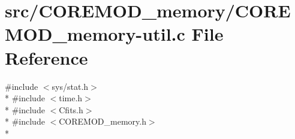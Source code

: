 \hypertarget{src_2COREMOD__memory_2COREMOD__memory-util_8c}{\section{src/\+C\+O\+R\+E\+M\+O\+D\+\_\+memory/\+C\+O\+R\+E\+M\+O\+D\+\_\+memory-\/util.c File Reference}
\label{src_2COREMOD__memory_2COREMOD__memory-util_8c}
}
{\ttfamily \#include $<$sys/stat.\+h$>$}\\*
{\ttfamily \#include $<$time.\+h$>$}\\*
{\ttfamily \#include $<$Cfits.\+h$>$}\\*
{\ttfamily \#include $<$C\+O\+R\+E\+M\+O\+D\+\_\+memory.\+h$>$}\\*

